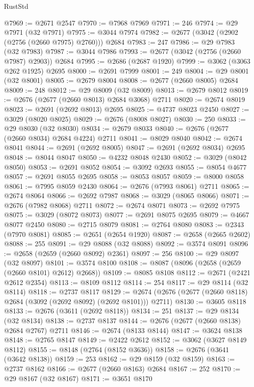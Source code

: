 \begin{lexlean}{RustStd}
\begin{coremodule}
@7969 := @2671 @2547
@7970 := @7968 @7969
@7971 := 246
@7974 := @29 @7971 (@32 @7971)
@7975 := @3044 @7974
@7982 := @2677 (@3042 (@2902 (@2756 (@2660 @7975) @2760))) @2684
@7983 := 247
@7986 := @29 @7983 (@32 @7983)
@7987 := @3044 @7986
@7993 := @2677 (@3042 (@2756 (@2660 @7987) @2903)) @2684
@7995 := @2686 (@2687 @1920)
@7999 := @3062 (@3063 @262 @1925) @2695
@8000 := @2691 @7999
@8001 := 249
@8004 := @29 @8001 (@32 @8001)
@8005 := @2679 @8004
@8008 := @2677 (@2660 @8005) @2684
@8009 := 248
@8012 := @29 @8009 (@32 @8009)
@8013 := @2679 @8012
@8019 := @2676 (@2677 (@2660 @8013) @2684 @3068) @2711
@8020 := @2674 @8019
@8023 := @2691 (@2692 @8013) @2695
@8025 := @4737 @8023 @2450
@8027 := @3029 (@8020 @8025)
@8029 := @2676 (@8008 @8027)
@8030 := 250
@8033 := @29 @8030 (@32 @8030)
@8034 := @2679 @8033
@8040 := @2676 (@2677 (@2660 @8034) @2684 @4224) @2711
@8041 := @8029 @8040
@8042 := @2674 @8041
@8044 := @2691 (@2692 @8005)
@8047 := @2691 (@2692 @8034) @2695
@8048 := @8044 @8047
@8050 := @4232 @8048 @2430
@8052 := @3029 (@8042 @8050)
@8053 := @2691 @8052
@8054 := @3092 @2693
@8055 := @8054 @4677
@8057 := @2691 @8055 @2695
@8058 := @8053 @8057
@8059 := @8000 @8058
@8061 := @7995 @8059 @2430
@8064 := @2676 (@7993 @8061) @2711
@8065 := @2674 @8064
@8066 := @2692 @7987
@8068 := @3029 (@8065 @8066)
@8071 := @2676 (@7982 @8068) @2711
@8072 := @2674 @8071
@8073 := @2692 @7975
@8075 := @3029 (@8072 @8073)
@8077 := @2691 @8075 @2695
@8079 := @4667 @8077 @2450
@8080 := @2715 @8079
@8081 := @2764 @8080
@8083 := @2343 (@7970 @8081)
@8085 := @2651 (@2654 @1920)
@8087 := @2658 (@2665 @2602)
@8088 := 255
@8091 := @29 @8088 (@32 @8088)
@8092 := @3574 @8091
@8096 := @2658 (@2659 (@2660 @8092) @2361)
@8097 := 256
@8100 := @29 @8097 (@32 @8097)
@8101 := @3574 @8100
@8108 := @8087 (@8096 (@2658 (@2659 (@2660 @8101) @2612) @2668))
@8109 := @8085 @8108
@8112 := @2671 (@2421 @2612 @2354)
@8113 := @8109 @8112
@8114 := 254
@8117 := @29 @8114 (@32 @8114)
@8118 := @2737 @8117
@8129 := @2674 (@2676 (@2677 (@2660 @8118) @2684 (@3092 (@2692 @8092) (@2692 @8101))) @2711)
@8130 := @3605 @8118
@8133 := @2676 (@3611 (@2692 @8118))
@8134 := 251
@8137 := @29 @8134 (@32 @8134)
@8138 := @2737 @8137
@8144 := @2676 (@2677 (@2660 @8138) @2684 @2767) @2711
@8146 := @2674 (@8133 @8144)
@8147 := @3624 @8138
@8148 := @2765 @8147
@8149 := @2422 @2612
@8152 := @3062 (@3627 @8149 @8112)
@8155 := @8148 (@2764 (@8152 @3636))
@8158 := @2676 (@3641 (@3642 @8138))
@8159 := 253
@8162 := @29 @8159 (@32 @8159)
@8163 := @2737 @8162
@8166 := @2677 (@2660 @8163) @2684
@8167 := 252
@8170 := @29 @8167 (@32 @8167)
@8171 := @3651 @8170

\end{coremodule}
\end{lexlean}

